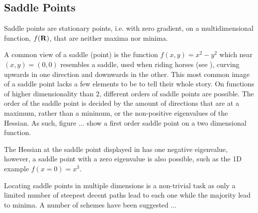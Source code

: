 \subsection{Saddle Points}
\label{sec:sps}

Saddle points are stationary points, i.e. with zero gradient, on a multidimensional function, $f({\mathrm{\mathbf{\bm{R}}}})$, that are neither maxima nor minima.


A common view of a saddle (point) is the function $f(x, y) = x^2 - y^2$ which near $(x,y) = (0,0)$ resembles a saddle, used when riding horses (see ), curving upwards in one direction and downwards in the other.
This most common image of a saddle point lacks a few elements to be to tell their whole story.
On functions of higher dimensionality than $2$, different orders of saddle points are possible.
The order of the saddle point is decided by the amount of directions that are at a maximum, rather than a minimum, or the non-positive eigenvalues of the Hessian.
As such, figure ... show a first order saddle point on a two dimensional function.

The Hessian at the saddle point displayed in  has one negative eigenvalue, however, a saddle point with a zero eigenvalue is also possible, such as the 1D example $f(x = 0) = x^3$. 

Locating saddle points in multiple dimensions is a non-trivial task as only a limited number of steepest decent paths lead to each one while the majority lead to minima.
A number of schemes have been suggested ...

\recent

\incomplete

